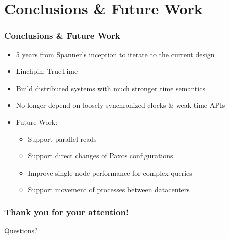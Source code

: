 \documentclass{beamer}
\begin{document}
\section{Conclusions \& Future Work}
\begin{frame}
  \frametitle{Conclusions \& Future Work}
  \begin{itemize}
    \item{5 years from Spanner's inception to iterate to the current design}
    \item{Linchpin: TrueTime}
    \item{Build distributed systems with much stronger time semantics}
    \item{No longer depend on loosely synchronized clocks \& weak time APIs}
    \pause
    \item{Future Work:}
    \begin{itemize}
      \item{Support parallel reads}
      \item{Support direct changes of Paxos configurations}
      \item{Improve single-node performance for complex queries}
      \item{Support movement of processes between datacenters}
    \end{itemize}
  \end{itemize}
\end{frame}

\begin{frame}
	\frametitle{Thank you for your attention!}
	\begin{center}
		\huge{Questions?}
	\end{center}
\end{frame}
\end{document}
